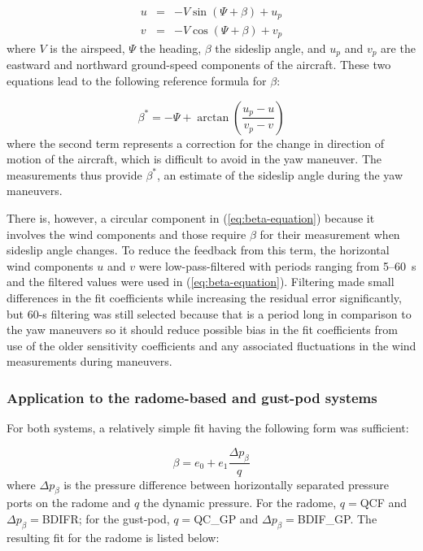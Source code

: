 \documentclass[12pt,twoside,english]{article}\usepackage[]{graphicx}\usepackage[]{color}
\begin{document}
\begin{eqnarray}
u & = & -V\sin(\Psi+\beta)+u_{p}\nonumber \\ v & = & -V\cos(\Psi+\beta)+v_{p}\label{eq:horizWindeqs} 
\end{eqnarray}
where $V$ is the airspeed, $\Psi$ the heading, $\beta$ the sideslip angle, and $u_{p}$ and $v_{p}$ are the eastward and northward ground-speed components of the aircraft. These two equations lead to the following reference formula for $\beta$: 

\begin{equation}
\beta^{*}=-\Psi+\arctan\left(\frac{u_{p}-u}{v_{p}-v}\right)\label{eq:beta-equation} 
\end{equation}
where the second term represents a correction for the change in direction of motion of the aircraft, which is difficult to avoid in the yaw maneuver. The measurements thus provide $\beta^{*}$, an estimate of the sideslip angle during the yaw maneuvers. 

There is, however, a circular component in (\ref{eq:beta-equation}) because it involves the wind components and those require $\beta$ for their measurement when sideslip angle changes. To reduce the feedback from this term, the horizontal wind components $u$ and $v$ were low-pass-filtered with periods ranging from 5--60~s and the filtered values were used in (\ref{eq:beta-equation}). Filtering made small differences in the fit coefficients while increasing the residual error significantly, but 60-s filtering was still selected because that is a period long in comparison to the yaw maneuvers so it should reduce possible bias in the fit coefficients from use of the older sensitivity coefficients and any associated fluctuations in the wind measurements during maneuvers. 


\subsubsection{Application to the radome-based and gust-pod systems\label{sub:radome-and-gust-pod-beta}}

For both systems, a relatively simple fit having the following form was sufficient: 

\begin{equation}
\beta=e_{0}+e_{1}\frac{\Delta p_{\beta}}{q}\label{eq:betaFunctionForm} 
\end{equation}
where $\Delta p_{\beta}$ is the pressure difference between horizontally separated pressure ports on the radome and $q$ the dynamic pressure. For the radome, $q=$QCF and $\Delta p_{\beta}=$BDIFR; for the gust-pod, $q=$QC\_GP and $\Delta p_{\beta}=$BDIF\_GP. The resulting fit for the radome is listed below: 
\end{document}
